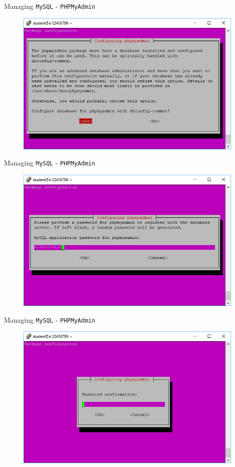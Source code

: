 \documentclass[xcolor=table,aspectratio=169]{beamer}
\begin{document}
\begin{frame}{Managing \texttt{MySQL} - \texttt{PHPMyAdmin}}
  \begin{figure}
    \begin{center}
      \includegraphics[width=0.7\linewidth]{MySQLInstall2.png}
    \end{center}
  \end{figure}
\end{frame}

\begin{frame}{Managing \texttt{MySQL} - \texttt{PHPMyAdmin}}
  \begin{figure}
    \begin{center}
      \includegraphics[width=0.7\linewidth]{MySQLInstall3.png}
    \end{center}
  \end{figure}
\end{frame}

\begin{frame}{Managing \texttt{MySQL} - \texttt{PHPMyAdmin}}
  \begin{figure}
    \begin{center}
      \includegraphics[width=0.7\linewidth]{MySQLInstall4.png}
    \end{center}
  \end{figure}
\end{frame}
\end{document}
